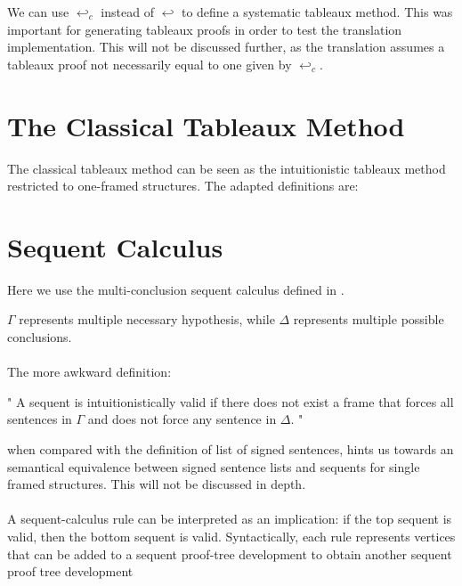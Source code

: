 \documentclass[runningheads]{llncs}
\begin{document}
\completeiteratordefinition

We can use $\hookleftarrow_c$ instead of $\hookleftarrow$ to define a systematic tableaux method. This was important for generating tableaux proofs in order to test 
the translation implementation. This will not be discussed further, as the translation assumes a tableaux proof not necessarily equal to one given by $\hookleftarrow_c$.


\section{The Classical Tableaux Method}

The classical tableaux method can be seen as the intuitionistic tableaux method restricted to 
one-framed structures. The adapted definitions are: 


\signedSentenceClassicalDefinition 
\fClassicalDefinition






\section{Sequent Calculus}
    Here we use the multi-conclusion sequent calculus defined in \cite{book2}. 

\sequentDefinition

$\Gamma $ represents multiple necessary hypothesis, while $\Delta$ represents multiple possible conclusions. 
\sequentValidityDefinition
\paragraph{}
The more awkward definition:


"
A sequent is intuitionistically valid if there does not exist a frame 
that forces all sentences in $\Gamma$ and does not force any sentence in $\Delta$.
"

when compared with the definition of list of signed sentences, hints us towards an semantical equivalence between signed sentence lists and sequents for single framed structures. This will not be discussed in depth. 

\paragraph{}
A sequent-calculus rule can be interpreted as an implication: if the top sequent is 
 valid, then the bottom sequent is valid. Syntactically, each rule represents vertices that can be added to a sequent proof-tree development 
to obtain another sequent proof tree development
\end{document}
